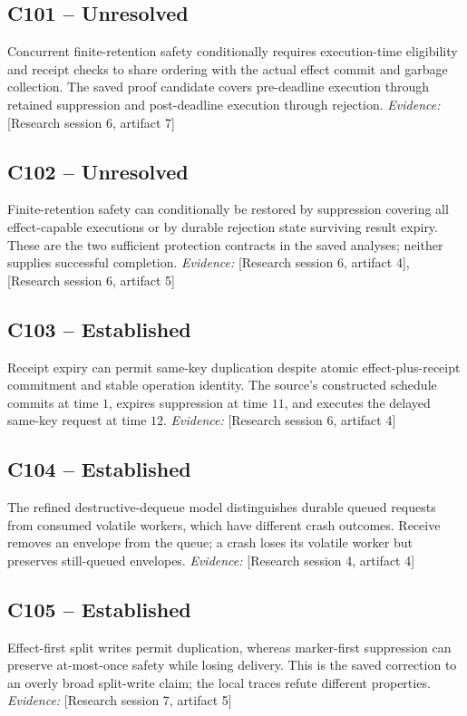 \documentclass[11pt]{article}
\begin{document}
\begin{sloppypar}
\subsection{C101 -- Unresolved}
Concurrent finite-retention safety conditionally requires execution-time eligibility and receipt checks to share ordering with the actual effect commit and garbage collection.
The saved proof candidate covers pre-deadline execution through retained suppression and post-deadline execution through rejection.
\textit{Evidence: }[Research session 6, artifact 7]
\subsection{C102 -- Unresolved}
Finite-retention safety can conditionally be restored by suppression covering all effect-capable executions or by durable rejection state surviving result expiry.
These are the two sufficient protection contracts in the saved analyses; neither supplies successful completion.
\textit{Evidence: }[Research session 6, artifact 4], [Research session 6, artifact 5]
\subsection{C103 -- Established}
Receipt expiry can permit same-key duplication despite atomic effect-plus-receipt commitment and stable operation identity.
The source's constructed schedule commits at time $1$, expires suppression at time $11$, and executes the delayed same-key request at time $12$.
\textit{Evidence: }[Research session 6, artifact 4]
\subsection{C104 -- Established}
The refined destructive-dequeue model distinguishes durable queued requests from consumed volatile workers, which have different crash outcomes.
Receive removes an envelope from the queue; a crash loses its volatile worker but preserves still-queued envelopes.
\textit{Evidence: }[Research session 4, artifact 4]
\subsection{C105 -- Established}
Effect-first split writes permit duplication, whereas marker-first suppression can preserve at-most-once safety while losing delivery.
This is the saved correction to an overly broad split-write claim; the local traces refute different properties.
\textit{Evidence: }[Research session 7, artifact 5]

\end{sloppypar}
\end{document}
